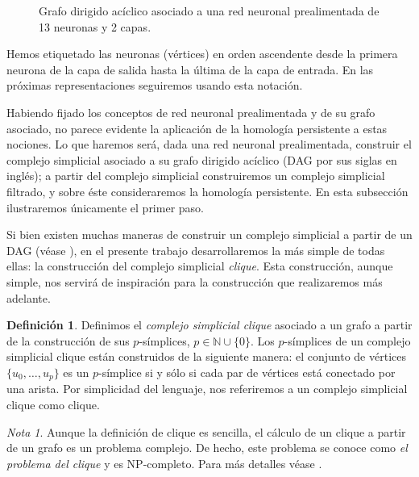 \documentclass[12pt, a4paper, twoside]{book}
\numberwithin{equation}{section}
\theoremstyle{definition}
\newtheorem{defi}{Definición}
\newenvironment{ejem}
  {\pushQED{\qed}\renewcommand{\qedsymbol}{$\blacktriangleleft$}\ejemplo}
  {\popQED\endejemplo}
\theoremstyle{remark}
\newtheorem*{remark}{Nota}
\theoremstyle{plain}
\begin{document}
\begin{ejem}
\begin{figure}[H]
			\caption{Grafo dirigido acíclico asociado a una red neuronal prealimentada de 13 neuronas y 2 capas.}
			\label{fig:redEjem}
		\end{figure}
		Hemos etiquetado las neuronas (vértices) en orden ascendente 
		desde la primera neurona de la capa de salida hasta la última
		de la capa de entrada. En las próximas representaciones 
		seguiremos usando esta notación.
	\end{ejem}
	
	Habiendo fijado los conceptos de red neuronal prealimentada y de su 
	grafo asociado, no parece evidente la aplicación de la homología 
	persistente a estas nociones. Lo que haremos será, dada una red 
	neuronal prealimentada, construir el complejo simplicial asociado a su
	grafo dirigido acíclico (DAG por sus siglas en inglés); a partir del 
	complejo simplicial construiremos un complejo simplicial filtrado, y 
	sobre éste consideraremos la homología persistente. En esta subsección
	ilustraremos únicamente el primer paso.

	Si bien existen muchas maneras de construir un complejo simplicial a 
	partir de un DAG (véase \cite{Clique-Jakob}), en el presente trabajo desarrollaremos la más simple
	de todas ellas: la construcción del complejo simplicial \emph{clique}. 
	Esta construcción, aunque simple, nos servirá de inspiración para la 
	construcción que realizaremos más adelante. 
	
	\begin{defi}
		Definimos el \textit{complejo simplicial clique} asociado a un
		grafo a partir de la construcción de sus $p$-símplices, $p \in 
		\mathbb{N}\cup\{0\}$. Los $p$-símplices de un complejo 
		simplicial clique están construidos de la siguiente manera: el 
		conjunto de vértices $\{u_{0},\dots,u_{p}\}$ es un 
		$p$-símplice si y sólo si cada par de vértices está conectado 
		por una arista. Por simplicidad del lenguaje, nos referiremos
		a un complejo simplicial clique como clique.
	\end{defi}

	\begin{remark}
		Aunque la definición de clique es sencilla, el cálculo de un 
		clique a partir de un grafo es un problema complejo. De hecho,
		este problema se conoce como \emph{el problema del clique} y 
		es NP-completo. Para más detalles véase \cite{NP-Karp}.
	\end{remark}
\end{document}

